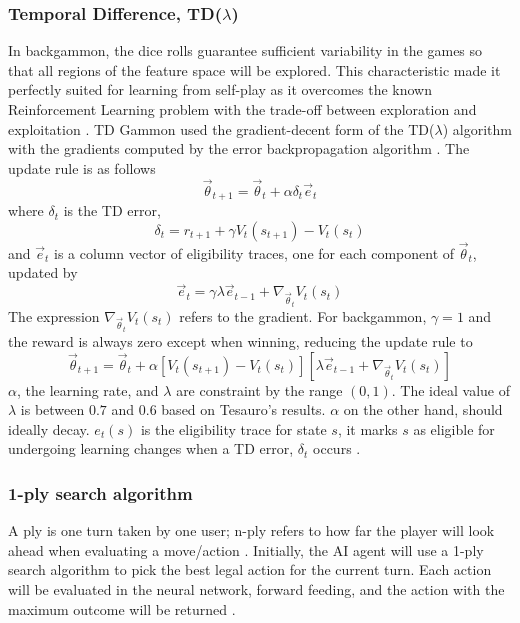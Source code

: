 \documentclass[12pt,a4paper]{article}
\begin{document}
\subsubsection{Temporal Difference, TD($\lambda$)}
In backgammon, the dice rolls guarantee sufficient variability in the games so that all regions of the feature space will be explored. This characteristic made it perfectly suited for learning from self-play as it overcomes the known Reinforcement Learning problem with the trade-off between exploration and exploitation \cite{survey}. TD Gammon used the gradient-decent form of the TD($\lambda$) algorithm with the gradients computed by the error backpropagation algorithm \cite{rl}. The update rule is as follows
$$\vec{\theta}_{t+1} = \vec{\theta}_{t} + \alpha\delta_t\vec{e}_{t}$$ 
where $\delta_t$ is the TD error,
$$\delta_{t} = r_{t+1} + \gamma V_t(s_{t+1}) - V_t(s_t)$$ 
and $\vec{e}_t$ is a column vector of eligibility traces, one for each component of $\vec{\theta}_t$, updated by 
$$\vec{e}_{t} = \gamma\lambda\vec{e}_{t-1} + \nabla_{\vec{\theta}_{t}}V_t(s_t)$$ 
The expression $\nabla_{\vec{\theta}_{t}}V_t(s_t)$ refers to the gradient. For backgammon, $\gamma=1$ and the reward is always zero except when winning, reducing the update rule to
$$\vec{\theta}_{t+1} = \vec{\theta}_{t} + \alpha[V_t(s_{t+1}) - V_t(s_t)][\lambda\vec{e}_{t-1} + \nabla_{\vec{\theta}_{t}}V_t(s_t)]$$
$\alpha$, the learning rate, and $\lambda$ are constraint by the range $(0,1)$. The ideal value of $\lambda$ is between $0.7$ and $0.6$ based on Tesauro's \citeyear{DBLP:journals/ai/Tesauro02} results. $\alpha$ on the other hand, should ideally decay. $e_t(s)$ is the eligibility trace for state $s$, it marks $s$ as eligible for undergoing learning changes when a TD error, $\delta_t$ occurs \cite{rl}.

\subsubsection{1-ply search algorithm}
A ply is one turn taken by one user; n-ply refers to how far the player will look ahead when evaluating a move/action \cite{glossary}. Initially, the AI agent will use a 1-ply search algorithm to pick the best legal action for the current turn. Each action will be evaluated in the neural network, forward feeding, and the action with the maximum outcome will be returned \cite{DBLP:conf/icml/Tesauro92}.
\end{document}

